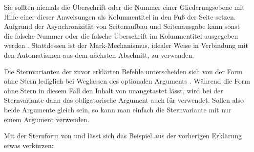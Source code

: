 \iftrue%
\leavevmode{}%
\else Erlauben Sie mir erneut einen wichtigen Hinweis:\textnote{Achtung!} %
\fi%
Sie sollten niemals die Überschrift oder die Nummer einer
Gliederungsebene mit Hilfe einer dieser Anweisungen als Kolumnentitel in den
Fuß der Seite setzen. Aufgrund der Asynchronizität von Seitenaufbau und
Seitenausgabe kann %
\iffalse%
es sonst leicht geschehen, dass die falsche Nummer oder die falsche
Überschrift im Kolumnentitel ausgegeben wird%
\else%
sonst die falsche Nummer oder die falsche Überschrift im Kolumnentitel
ausgegeben werden%
\fi%
. Stattdessen ist der Mark-Mechanismus, idealer Weise in Verbindung mit den
Automatismen aus dem nächsten Abschnitt, zu verwenden.%
\EndIndexGroup


\begin{Declaration}
\end{Declaration}
Die Sternvarianten der zuvor
erklärten Befehle unterscheiden sich von der Form ohne Stern lediglich bei
Weglassen des optionalen Arguments . Während die Form ohne Stern in diesem Fall den Inhalt
von  unangetastet lässt, wird
bei der Sternvariante dann das obligatorische Argument  auch für 
verwendet. Sollen also beide Argumente gleich sein, so kann man einfach die
Sternvariante mit nur einem Argument verwenden.%
%
\begin{Example}
  Mit der Sternform von  und
   lässt sich das
  Beispiel aus der vorherigen Erklärung etwas verkürzen:
\end{Example}%
